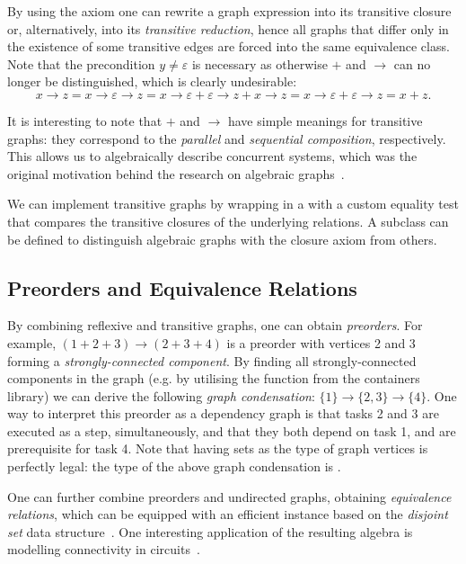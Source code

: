 By using the axiom one can rewrite a graph expression into its transitive closure or,
alternatively, into its \emph{transitive reduction}, hence all graphs that differ only in the
existence of some transitive edges are forced into the same equivalence class. Note that the
precondition $y \neq \varepsilon$ is necessary as otherwise $+$ and $\rightarrow$ can no
longer be distinguished, which is clearly undesirable:
\[
x\!\rightarrow\!z = x\!\rightarrow\!\varepsilon\!\rightarrow z = x\!\rightarrow\!\varepsilon
 + \varepsilon\!\rightarrow\!z + x\!\rightarrow\!z = x\!\rightarrow\!\varepsilon
 + \varepsilon\!\rightarrow\!z = x + z.
\]

It is interesting to note that $+$ and $\rightarrow$ have simple meanings for transitive
graphs: they correspond to the \emph{parallel} and \emph{sequential composition},
respectively. This allows us to algebraically describe concurrent systems, which was
the original motivation behind the research on algebraic graphs~\cite{2014_algebra_mokhov}.

We can implement transitive graphs by wrapping
 in a  with a custom equality test that
compares the transitive closures of the underlying relations.
A subclass  can be
defined to distinguish algebraic graphs with the closure axiom from others.

\subsection{Preorders and Equivalence Relations}\label{sub-preorder}

By combining reflexive and transitive graphs, one can obtain \emph{preorders}.
For example, $(1 + 2 + 3) \rightarrow (2 + 3 + 4)$
is a preorder with vertices 2 and 3 forming a \emph{strongly-connected component}. By
finding all strongly-connected components in the graph (e.g. by utilising the
function  from the \textsf{containers} library) we can derive the
following \emph{graph condensation}:
$\{1\} \rightarrow \{2, 3\} \rightarrow \{4\}$. One way to interpret this preorder as a
dependency graph is that tasks 2 and 3 are executed as a step, simultaneously,
and that they both depend on task 1, and are prerequisite for task 4. Note that
having sets as the type of graph vertices is perfectly legal: the type of the
above graph condensation is .

One can further combine preorders and undirected graphs, obtaining \emph{equivalence
relations}, which can be equipped with an efficient instance based on the
\emph{disjoint set} data structure~\cite{1984_set_union_tarjan}. One interesting
application of the resulting algebra is modelling connectivity in
circuits~\cite{2015_mokhov_algebra}.

